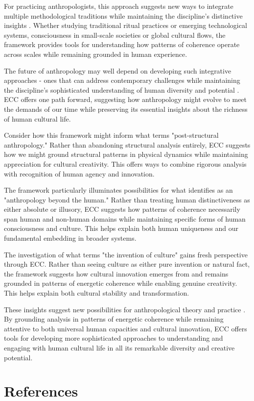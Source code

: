 \begin{refsection}
For practicing anthropologists, this approach suggests new ways to integrate multiple methodological traditions while maintaining the discipline's distinctive insights \cite{rabinow2008marking}. Whether studying traditional ritual practices or emerging technological systems, consciousness in small-scale societies or global cultural flows, the framework provides tools for understanding how patterns of coherence operate across scales while remaining grounded in human experience.

The future of anthropology may well depend on developing such integrative approaches - ones that can address contemporary challenges while maintaining the discipline's sophisticated understanding of human diversity and potential \cite{ortner2016dark}. ECC offers one path forward, suggesting how anthropology might evolve to meet the demands of our time while preserving its essential insights about the richness of human cultural life.

Consider how this framework might inform what \cite{viveiros2014cannibal} terms "post-structural anthropology." Rather than abandoning structural analysis entirely, ECC suggests how we might ground structural patterns in physical dynamics while maintaining appreciation for cultural creativity. This offers ways to combine rigorous analysis with recognition of human agency and innovation.

The framework particularly illuminates possibilities for what \cite{kohn2013forests} identifies as an "anthropology beyond the human." Rather than treating human distinctiveness as either absolute or illusory, ECC suggests how patterns of coherence necessarily span human and non-human domains while maintaining specific forms of human consciousness and culture. This helps explain both human uniqueness and our fundamental embedding in broader systems.

The investigation of what \cite{wagner2016invention} terms "the invention of culture" gains fresh perspective through ECC. Rather than seeing culture as either pure invention or natural fact, the framework suggests how cultural innovation emerges from and remains grounded in patterns of energetic coherence while enabling genuine creativity. This helps explain both cultural stability and transformation.

These insights suggest new possibilities for anthropological theory and practice \cite{rabinow2008marking}. By grounding analysis in patterns of energetic coherence while remaining attentive to both universal human capacities and cultural innovation, ECC offers tools for developing more sophisticated approaches to understanding and engaging with human cultural life in all its remarkable diversity and creative potential.

\newpage
\section{References}
\printbibliography[title={},heading=subbibliography]
\end{refsection}